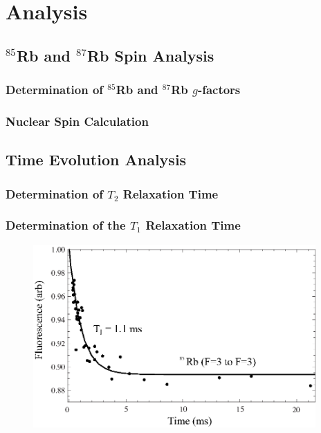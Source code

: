 
\section{Analysis}\label{analysis}

\subsection{$^{85}$Rb and $^{87}$Rb Spin Analysis}

\subsubsection{Determination of $^{85}$Rb and $^{87}$Rb $g$-factors}

\subsubsection{Nuclear Spin Calculation}

\subsection{Time Evolution Analysis}

\subsubsection{Determination of $T_{2}$ Relaxation Time}

\subsubsection{Determination of the $T_{1}$ Relaxation Time}

\begin{figure}[htbp]
\begin{center}
\includegraphics[height=70mm]{./figures/T1.eps}
\caption{\small{}}
\label{fig:}
\end{center}
\end{figure}

